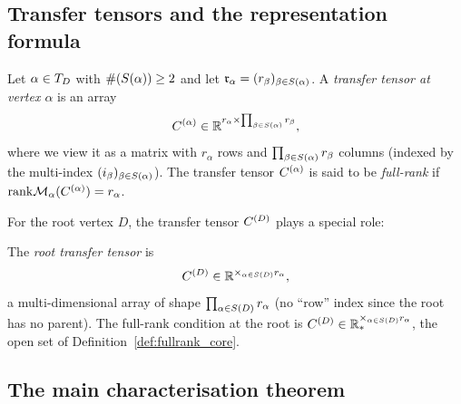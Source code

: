 \subsection*{Transfer tensors and the representation formula}

\begin{definition}
\label{def:transfer_tensor}
Let $\alpha \in T_D$ with $\#(S(\alpha)) \geq 2$ and let
$\mathfrak{r}_\alpha = (r_\beta)_{\beta \in S(\alpha)}$. A
\emph{transfer tensor at vertex $\alpha$} is an array
\begin{equation*}
    C^{(\alpha)} \in \mathbb{R}^{r_\alpha \times \prod_{\beta \in S(\alpha)} r_\beta},
\end{equation*}
where we view it as a matrix with $r_\alpha$ rows and
$\prod_{\beta \in S(\alpha)} r_\beta$ columns (indexed by the
multi-index $(i_\beta)_{\beta \in S(\alpha)}$). The transfer tensor
$C^{(\alpha)}$ is said to be \emph{full-rank} if
$\mathrm{rank} \mathcal{M}_{\alpha}(C^{(\alpha)}) = r_\alpha$.
\end{definition}

For the root vertex $D$, the transfer tensor $C^{(D)}$ plays a special role:

\begin{definition}
\label{def:root_transfer}
The \emph{root transfer tensor} is
\begin{equation*}
    C^{(D)} \in \mathbb{R}^{\times_{\alpha \in S(D)} r_\alpha},
\end{equation*}
a multi-dimensional array of shape $\prod_{\alpha \in S(D)} r_\alpha$
(no ``row'' index since the root has no parent). The full-rank
condition at the root is $C^{(D)} \in \mathbb{R}^{\times_{\alpha \in S(D)}
r_\alpha}_*$, the open set of Definition~\ref{def:fullrank_core}.
\end{definition}

\subsection*{The main characterisation theorem}

